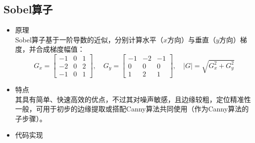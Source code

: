 \documentclass[11pt]{article}
\begin{document}
  \subsection*{Sobel算子}
  \begin{itemize}
  	\item 原理\\
  	Sobel算子基于一阶导数的近似，分别计算水平（$x$方向）与垂直（$y$方向）梯度，并合成梯度幅值：
  	$$G_x=\begin{bmatrix}-1&0&1\\-2&0&2\\-1&0&1\end{bmatrix},\quad
  	G_y=\begin{bmatrix}-1&-2&-1\\0&0&0\\1&2&1\end{bmatrix},\quad
  	|G|=\sqrt{G_x^2+G_y^2}$$
  	\item 特点\\
  	其具有简单、快速高效的优点，不过其对噪声敏感，且边缘较粗，定位精准性一般，可用于初步的边缘提取或搭配Canny算法共同使用（作为Canny算法的子步骤）。
  	\item 代码实现
  	\begin{center}
  	\end{center}
  \end{itemize}
  
\end{document}
